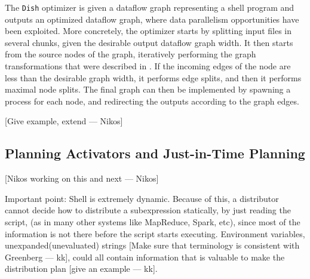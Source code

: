 \documentclass[sigplan,10pt,review,anonymous]{acmart}
\newcommand{\ttt}[1]{\texttt{\small #1}}
\newcommand{\nv}[1]{[{\color{cyan}#1 --- Nikos}]}
\newcommand{\kk}[1]{[{\color{magenta}#1 --- kk}]}
\begin{document}
The \ttt{Dish} optimizer is given a dataflow graph representing a
shell program and outputs an optimized dataflow graph, where data
parallelism opportunities have been exploited. More concretely, the
optimizer starts by splitting input files in several chunks, given the
desirable output dataflow graph width. It then starts from the source
nodes of the graph, iteratively performing the graph transformations
that were described in . If the incoming
edges of the node are less than the desirable graph width, it performs
edge splits, and then it performs maximal node splits. The final graph
can then be implemented by spawning a process for each node, and
redirecting the outputs according to the graph edges.

\nv{Give example, extend}






\subsection{Planning Activators and Just-in-Time Planning}

\nv{Nikos working on this and next}


Important point: Shell is extremely dynamic. Because of this, a
distributor cannot decide how to distribute a subexpression
statically, by just reading the script, (as in many other systems like
MapReduce, Spark, etc), since most of the information is not there
before the script starts executing. Environment variables,
unexpanded(unevaluated) strings \kk{Make sure that terminology is
  consistent with Greenberg}, could all contain information that is
valuable to make the distribution plan \kk{give an example}.
\end{document}
